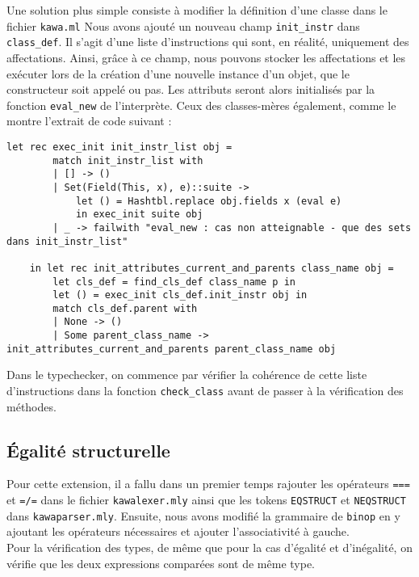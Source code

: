 \documentclass{article}
\begin{document}
Une solution plus simple consiste à modifier 
la définition d'une classe dans le fichier \texttt{kawa.ml}
Nous avons ajouté un nouveau champ \texttt{init\_instr} 
dans \texttt{class\_def}. Il s'agit d'une liste 
d'instructions qui sont, en réalité, uniquement 
des affectations. Ainsi, grâce à ce champ, nous pouvons 
stocker les affectations et les exécuter lors de la création d'une nouvelle instance 
d'un objet, que le constructeur soit appelé ou pas. Les attributs seront alors 
initialisés par la fonction \texttt{eval\_new} de l'interprète. Ceux des 
classes-mères également, comme le montre l'extrait de code suivant : \\
\begin{lstlisting}[style=mystyle, language=caml]
    let rec exec_init init_instr_list obj = 
        match init_instr_list with
        | [] -> ()
        | Set(Field(This, x), e)::suite -> 
            let () = Hashtbl.replace obj.fields x (eval e) 
            in exec_init suite obj
        | _ -> failwith "eval_new : cas non atteignable - que des sets dans init_instr_list"

    in let rec init_attributes_current_and_parents class_name obj = 
        let cls_def = find_cls_def class_name p in  
        let () = exec_init cls_def.init_instr obj in 
        match cls_def.parent with
        | None -> ()
        | Some parent_class_name -> init_attributes_current_and_parents parent_class_name obj
\end{lstlisting}

Dans le typechecker, on commence par vérifier la cohérence de cette liste 
d'instructions dans la fonction \texttt{check\_class} avant de passer à la vérification des méthodes.


\subsection{Égalité structurelle}
Pour cette extension, il a fallu dans un premier temps rajouter les opérateurs \texttt{===} et \texttt{=/=} dans le fichier \texttt{kawalexer.mly} ainsi que 
les tokens \texttt{EQSTRUCT} et \texttt{NEQSTRUCT} 
dans \texttt{kawaparser.mly}. Ensuite, nous avons modifié la grammaire de 
\texttt{binop} en y ajoutant les opérateurs nécessaires 
et ajouter l'associativité à gauche. \\

Pour la vérification des types, de même que pour la cas d'égalité et d'inégalité, on vérifie que les deux expressions comparées sont de même type.
\end{document}
